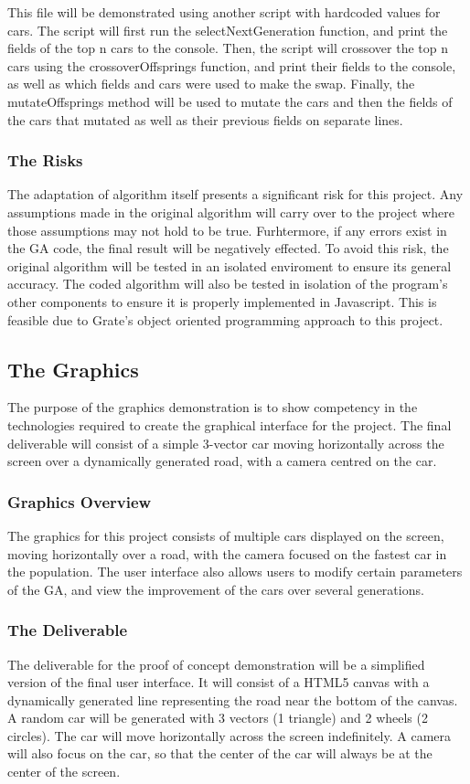 \documentclass{article}
\begin{document}
This file will be demonstrated using another script with hardcoded values for 
cars. The script will first run the selectNextGeneration function, and print the 
fields of the top n cars to the console. Then, the script will crossover the top 
n cars using the crossoverOffsprings function, and print their fields to the 
console, as well as which fields and cars were used to make the swap. Finally, 
the mutateOffsprings method will be used to mutate the cars and then the fields 
of the cars that mutated as well as their previous fields on separate lines.

\subsubsection{The Risks}
The adaptation of algorithm itself presents a significant risk for this project. 
Any assumptions made in the original algorithm will carry over to the project 
where those assumptions may not hold to be true.  Furhtermore, if any errors 
exist in the GA code, the final result will be negatively effected. To avoid 
this risk, the original algorithm will be tested in an isolated enviroment to 
ensure its general accuracy. The coded algorithm will also be tested in 
isolation of the program's other components to ensure it is properly implemented 
in Javascript. This is feasible due to Grate's object oriented programming 
approach to this project.

\subsection{The Graphics}
The purpose of the graphics demonstration is to show competency in the 
technologies required to create the graphical interface for the project. The 
final deliverable will consist of a simple 3-vector car moving horizontally 
across the screen over a dynamically generated road, with a camera centred on 
the car.

\subsubsection{Graphics Overview}
The graphics for this project consists of multiple cars displayed on the screen, 
moving horizontally over a road, with the camera focused on the fastest car in 
the population. The user interface also allows users to modify certain 
parameters of the GA, and view the improvement of the cars over several 
generations. 

\subsubsection{The Deliverable}
The deliverable for the proof of concept demonstration will be a simplified 
version of the final user interface. It will consist of a HTML5 canvas with a 
dynamically generated line representing the road near the bottom of the canvas. 
A random car will be generated with 3 vectors (1 triangle) and 2 wheels (2 
circles). The car will move horizontally across the screen indefinitely. A 
camera will also focus on the car, so that the center of the car will always be 
at the center of the screen.
\end{document}
